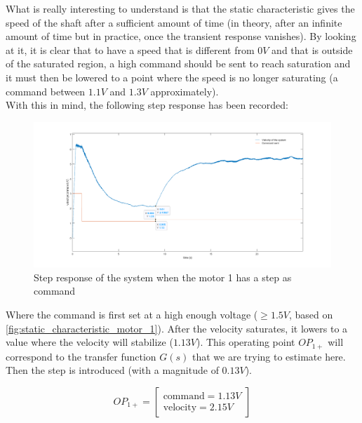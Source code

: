 What is really interesting to understand is that the static characteristic gives the speed of the shaft after a
sufficient amount of time (in theory, after an infinite amount of time but in practice, once the transient response 
vanishes). By looking at it, it is clear that to have a speed that is different from $0 V$ and that is outside of the
saturated region, a high command should be sent to reach saturation and it must then be lowered to a point where the
speed is no longer saturating (a command between $1.1 V$ and $1.3 V$ approximately).\\

With this in mind, the following step response has been recorded:

\begin{figure}[H]
    \centering
    \includegraphics[height=\textheight/3]{Pictures/step_response_positive_motor_1.png}
    \caption{Step response of the system when the motor 1 has a step as command}
    \label{fig:step_response_positive_motor_1}
\end{figure}


Where the command is first set at a high enough voltage ($\geq 1.5 V$, based on \ref{fig:static_characteristic_motor_1}). 
After the velocity saturates, it lowers to a value where the velocity will stabilize ($1.13 V$). This operating point 
\textit{$OP_{1+}$} will correspond to the transfer function $G(s)$ that we are trying to estimate here. Then the step is
introduced (with a magnitude of $0.13 V$).

\begin{equation}
    OP_{1+} = \begin{bmatrix}
        \text{command} = 1.13 V \\
        \text{velocity} = 2.15 V
    \end{bmatrix}
\end{equation}

